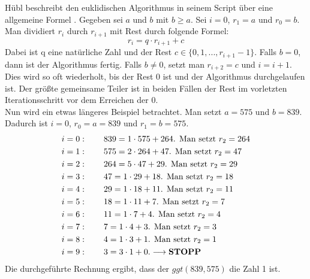 Hübl beschreibt den euklidischen Algorithmus in seinem Script über eine allgemeine Formel \cite[S. 256-257]{Dr.ReinholdHubl.2022}. Gegeben sei $a$ und $b$ mit $b \geq a$. Sei $i = 0$, $r_{1} = a$ und $r_{0} = b$. Man dividiert $r_{i}$ durch $r_{i + 1}$ mit Rest durch folgende Formel: $$r_{i} = q \cdot r_{i + 1} + c$$
Dabei ist q eine natürliche Zahl und der Rest $c \in \{0, 1, ..., r_{i + 1} - 1\}$. Falls $b = 0$, dann ist der Algorithmus fertig. Falls $b \neq 0$, setzt man $r_{i + 2} = c$ und $i = i + 1$. Dies wird so oft wiederholt, bis der Rest 0 ist und der Algorithmus durchgelaufen ist. Der größte gemeinsame Teiler ist in beiden Fällen der Rest im vorletzten Iterationsschritt vor dem Erreichen der 0.\\

Nun wird ein etwas längeres Beispiel betrachtet. Man setzt $a = 575$ und $b = 839$. Dadurch ist  $i = 0$, $r_{0} = a = 839$ und $r_{1} = b = 575$.
\begin{align*}
&i = 0: \qquad 839 = 1 \cdot 575 + 264\text{. Man setzt } r_{2} = 264\\
&i = 1: \qquad 575 = 2 \cdot 264 + 47\text{. Man setzt } r_{2} = 47\\
&i = 2: \qquad 264 = 5 \cdot 47 + 29\text{. Man setzt } r_{2} = 29\\
&i = 3: \qquad 47 = 1 \cdot 29 + 18\text{. Man setzt } r_{2} = 18\\
&i = 4: \qquad 29 = 1 \cdot 18 + 11\text{. Man setzt } r_{2} = 11\\
&i = 5: \qquad 18 = 1 \cdot 11 + 7\text{. Man setzt } r_{2} = 7\\
&i = 6: \qquad 11 = 1 \cdot 7 + 4\text{. Man setzt } r_{2} = 4\\
&i = 7: \qquad 7 = 1 \cdot 4 + 3\text{. Man setzt } r_{2} = 3\\
&i = 8: \qquad 4 = 1 \cdot 3 + 1\text{. Man setzt } r_{2} = 1\\
&i = 9: \qquad 3 = 3 \cdot 1 + 0\text{.}\longrightarrow\text{\textbf{STOPP}}
\end{align*}
Die durchgeführte Rechnung ergibt, dass der $ggt(839, 575)$ die Zahl 1 ist.\\


